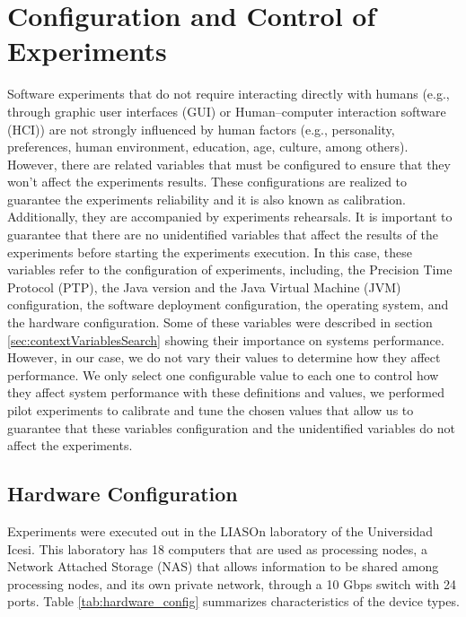 \section{Configuration and Control of Experiments}
\label{sec:confandControl}
Software experiments that do not require interacting directly with humans (e.g., through graphic user interfaces (GUI) or Human–computer interaction software (HCI)) are not strongly influenced by human factors (e.g., personality, preferences, human environment, education, age, culture, among others). However, there are related variables that must be configured to ensure that they won't affect the experiments results. These configurations are realized to guarantee the experiments reliability and it is also known as calibration. Additionally, they are accompanied by experiments rehearsals. It is important to guarantee that there are no unidentified variables that affect the results of the experiments before starting the experiments execution. In this case, these variables refer to the configuration of experiments, including, the Precision Time Protocol (PTP), the Java version and the Java Virtual Machine (JVM) configuration, the software deployment configuration, the operating system, and the hardware configuration. Some of these variables were described in section \ref{sec:contextVariablesSearch} showing their importance on systems performance. However, in our case, we do not vary their values to determine how they affect performance. We only select one configurable value to each one to control how they affect system performance with these definitions and values, we performed pilot experiments to calibrate and tune the chosen values that allow us to guarantee that these variables configuration and the unidentified variables do not affect the experiments. 

\subsection{Hardware Configuration}
Experiments were executed out in the LIASOn laboratory of the Universidad Icesi. This laboratory has 18 computers that are used as processing nodes, a Network Attached Storage (NAS) that allows information to be shared among processing nodes, and its own private network, through a 10 Gbps switch with 24 ports. Table \ref {tab:hardware_config} summarizes characteristics of the device types. 

